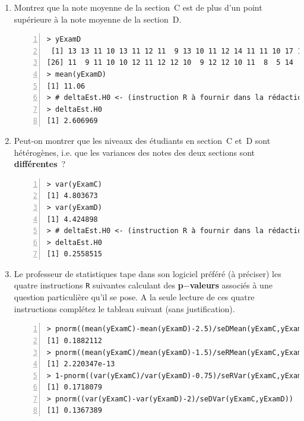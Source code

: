 \documentclass[10pt]{report}
\begin{document}
\begin{exercice}
\begin{enumerate}
\item Montrez que la note moyenne de la section~C est de plus d'un point sup{\'e}rieure {\`a} la note moyenne de la section~D.

\IndicR
\begin{Verbatim}[frame=leftline,fontfamily=tt,fontshape=n,numbers=left]
> yExamD
 [1] 13 13 11 10 13 11 12 11  9 13 10 11 12 14 11 11 10 17 10  7 17 11  9 10 14
[26] 11  9 11 10 10 12 11 12 12 10  9 12 12 10 11  8  5 14  9 12 11 11  9 11 11
> mean(yExamD)
[1] 11.06
> # deltaEst.H0 <- (instruction R à fournir dans la rédaction)
> deltaEst.H0
[1] 2.606969
\end{Verbatim}

 


\item Peut-on montrer que les niveaux des {\'e}tudiants en section~C et~D sont h{\'e}t{\'e}rog{\`e}nes, i.e. que les variances des notes des deux sections sont \textbf{diff{\'e}rentes}~?

\IndicR
\begin{Verbatim}[frame=leftline,fontfamily=tt,fontshape=n,numbers=left]
> var(yExamC)
[1] 4.803673
> var(yExamD)
[1] 4.424898
> # deltaEst.H0 <- (instruction R à fournir dans la rédaction)
> deltaEst.H0
[1] 0.2558515
\end{Verbatim}

 


\item Le professeur de statistiques tape dans son logiciel préféré (à préciser) les quatre instructions \texttt{R} suivantes calculant des \textbf{p$-$valeurs} associ{\'e}s {\`a} une question particuli{\`e}re qu'il se pose. A la seule lecture de ces quatre instructions compl{\'e}tez le tableau suivant (sans justification). 


\begin{Verbatim}[frame=leftline,fontfamily=tt,fontshape=n,numbers=left]
> pnorm((mean(yExamC)-mean(yExamD)-2.5)/seDMean(yExamC,yExamD))      ## test 1
[1] 0.1882112
> pnorm((mean(yExamC)/mean(yExamD)-1.5)/seRMean(yExamC,yExamD))      ## test 2
[1] 2.220347e-13
> 1-pnorm((var(yExamC)/var(yExamD)-0.75)/seRVar(yExamC,yExamD))      ## test 3
[1] 0.1718079
> pnorm((var(yExamC)-var(yExamD)-2)/seDVar(yExamC,yExamD))           ## test 4
[1] 0.1367389
\end{Verbatim}


\vspace*{1cm}


\end{enumerate}
\end{exercice}
\end{document}

